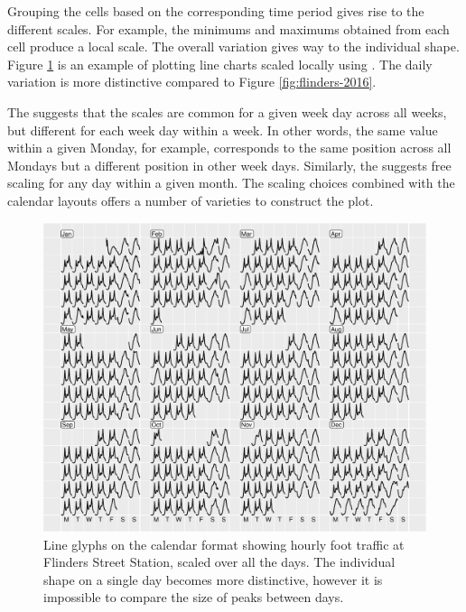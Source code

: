 \documentclass[article]{jss}
\theoremstyle{definition}
\theoremstyle{definition}
\theoremstyle{remark}
\begin{document}
Grouping the cells based on the corresponding time period gives rise to
the different scales. For example, the minimums and maximums obtained
from each cell produce a local scale. The overall variation gives way to
the individual shape. Figure \ref{fig:flinders-free} is an example of
plotting line charts scaled locally using . The
daily variation is more distinctive compared to Figure
\ref{fig:flinders-2016}.

The  suggests that the scales are common for a given
week day across all weeks, but different for each week day within a
week. In other words, the same value within a given Monday, for example,
corresponds to the same position across all Mondays but a different
position in other week days. Similarly, the  suggests
free scaling for any day within a given month. The scaling choices
combined with the calendar layouts offers a number of varieties to
construct the plot.

\begin{CodeChunk}
\begin{figure}

{\centering \includegraphics[width=\textwidth]{figure/flinders-free-1} 

}

\caption[Line glyphs on the calendar format showing
hourly foot traffic at Flinders Street Station, scaled over all the
days. The individual shape on a single day becomes more distinctive,
however it is impossible to compare the size of peaks between days.]{Line glyphs on the calendar format showing
hourly foot traffic at Flinders Street Station, scaled over all the
days. The individual shape on a single day becomes more distinctive,
however it is impossible to compare the size of peaks between days.}\label{fig:flinders-free}
\end{figure}
\end{CodeChunk}
\end{document}
